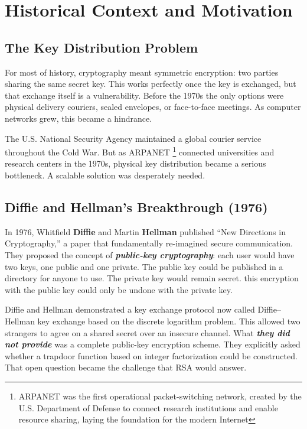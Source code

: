 \chapter{Historical Context and Motivation}

\section{The Key Distribution Problem}

For most of history, cryptography meant symmetric encryption: two parties sharing the same secret key. This works perfectly once the key is exchanged, but that exchange itself is a vulnerability. Before the 1970s the only options were physical delivery couriers, sealed envelopes, or face-to-face meetings. As computer networks grew, this became a hindrance.

The U.S. National Security Agency maintained a global courier service throughout the Cold War. But as ARPANET \footnote{ARPANET was the first operational packet-switching network, created by the U.S. Department of Defense to connect research institutions and enable resource sharing, laying the foundation for the modern Internet} connected universities and research centers in the 1970s, physical key distribution became a serious bottleneck. A scalable solution was desperately needed.

\section{Diffie and Hellman's Breakthrough (1976)}

In 1976, Whitfield \textbf{Diffie} and Martin \textbf{Hellman} published ``New Directions in Cryptography,'' a paper that fundamentally re-imagined secure communication. They proposed the concept of \emph{\textbf{public-key cryptography}}: each user would have two keys, one public and one private. The public key could be published in a directory for anyone to use. The private key would remain secret. this encryption with the public key could only be undone with {\small the private key}. \par\vspace{0.05in}
Diffie and Hellman demonstrated a key exchange protocol now called Diffie–Hellman key exchange based on the discrete logarithm problem. This allowed two strangers to agree on a shared secret over an insecure channel. What \emph{\textbf{they did not provide}} was a complete public-key encryption scheme. They explicitly asked whether a trapdoor function based on integer factorization could be constructed. That open question became the challenge that RSA would answer.

